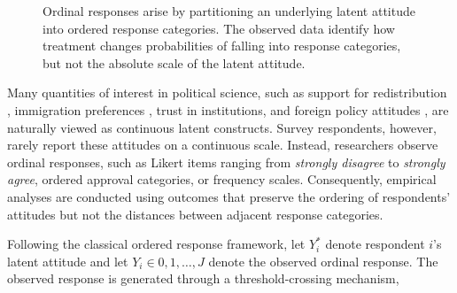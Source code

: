 \documentclass{article}
\begin{document}
\begin{figure}[ht]
\centering
{}

\caption{Ordinal responses arise by partitioning an underlying latent attitude into ordered response categories. The observed data identify how treatment changes probabilities of falling into response categories, but not the absolute scale of the latent attitude.}
\label{fig:latent}
\end{figure}

Many quantities of interest in political science, such as support for redistribution \citep{Alt2017a, Magni2021a}, immigration preferences \citep{Mayda2005a}, trust in institutions, and foreign policy attitudes \citep{Scheve2001r, Tomz2020a}, are naturally viewed as continuous latent constructs. Survey respondents, however, rarely report these attitudes on a continuous scale. Instead, researchers observe ordinal responses, such as Likert items ranging from \textit{strongly disagree} to \textit{strongly agree}, ordered approval categories, or frequency scales. Consequently, empirical analyses are conducted using outcomes that preserve the ordering of respondents’ attitudes but not the distances between adjacent response categories.

Following the classical ordered response framework, let $Y_i^\ast$ denote respondent $i$’s latent attitude and let $Y_i\in{0,1,\ldots,J}$ denote the observed ordinal response. The observed response is generated through a threshold-crossing mechanism,
\end{document}
